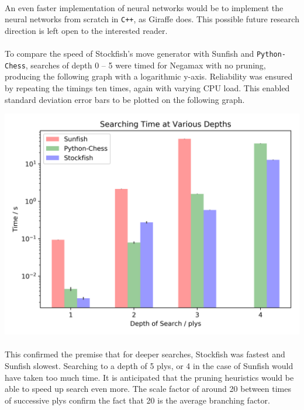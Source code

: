 \documentclass[12pt,a4paper]{book}
\begin{document}
\paragraph{} An even faster implementation of neural networks would be to implement the neural networks from scratch in \texttt{C++}, as Giraffe does. This possible future research direction is left open to the interested reader. 

\paragraph{} To compare the speed of Stockfish's move generator with Sunfish and \texttt{Python-Chess}, searches of depth 0 -- 5 were timed for Negamax with no pruning, producing the following graph with a logarithmic y-axis. Reliability was ensured by repeating the timings ten times, again with varying CPU load. This enabled standard deviation error bars to be plotted on the following graph.

\begin{center}
  \includegraphics[scale=0.8]{movegenspeed.png}
\end{center}

\paragraph{} This confirmed the premise that for deeper searches, Stockfish was fastest and Sunfish slowest. Searching to a depth of 5 plys, or 4 in the case of Sunfish would have taken too much time. It is anticipated that the pruning heuristics would be able to speed up search even more. The scale factor of around 20 between times of successive plys confirm the fact that 20 is the average branching factor.
\end{document}
